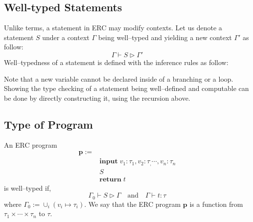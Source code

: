 \documentclass{article}
\newcommand{\dreal}{\textbf{R}}
\newcommand{\dint}{\textbf{Z}}
\newcommand{\prog}{\boldsymbol{p}}
\begin{document}
\vspace{1em}



\subsection{Well-typed Statements}
Unlike terms, a statement in ERC may modify contexts. Let us denote 
a statement $S$ under a context $\Gamma$ being well--typed 
and yielding a new context $\Gamma'$ as follow:
\[
\Gamma \vdash S \triangleright \Gamma'
\]
Well--typedness of a statement is defined with the inference rules as follow:

\vspace{1em}
\vspace{1em}

Note that a new variable cannot be declared inside of a branching or a loop.
Showing the type checking of a statement being well--defined and computable 
can be done by directly constructing it,
using the recursion  above.

\subsection{Type of Program}
An ERC program 
\begin{align*}
\prog := &\\
&\textbf{input}\;v_1 : \tau_1, v_2 : \tau_, \cdots, v_n : \tau_n \\
&S \\
&\textbf{return}\;t 
\end{align*}
is well--typed if, 
\[
 \Gamma_0 \vdash S \triangleright \Gamma \quad\text{and}\quad \Gamma \vdash t : \tau
\]
where $\Gamma_0 := \cup_i(v_i \mapsto \tau_i)$. We say that the ERC program 
$\prog$ is a function from $\tau_1\times\cdots\times\tau_n$ to $\tau$.
\end{document}
